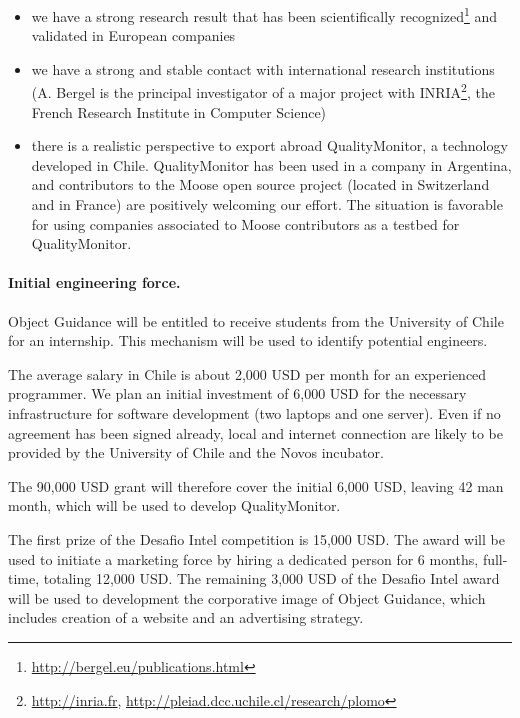 \documentclass[runningheads]{llncs}
\begin{document}
\begin{itemize}
\item we have a strong research result that has been scientifically recognized\footnote{\url{http://bergel.eu/publications.html}} and validated in European companies
\item we have a strong and stable contact with international research institutions (A. Bergel is the principal investigator of a major project with INRIA\footnote{\url{http://inria.fr}, \url{http://pleiad.dcc.uchile.cl/research/plomo}}, the French Research Institute in Computer Science)
\item there is a realistic perspective to export abroad QualityMonitor, a technology developed in Chile. QualityMonitor has been used in a company in Argentina, and contributors to the Moose open source project (located in Switzerland and in France) are positively welcoming our effort. The situation is favorable for using companies associated to Moose contributors as a testbed for QualityMonitor.
\end{itemize}

\paragraph{Initial engineering force.} Object Guidance will be entitled to receive students from the University of Chile for an internship. This mechanism will be used to identify potential engineers.

The average salary in Chile is about 2,000 USD per month for an experienced programmer. We plan an initial investment of 6,000 USD for the necessary infrastructure for software development (two laptops and one server). Even if no agreement has been signed already, local and internet connection are likely to be provided by the University of Chile and the Novos incubator. 

The 90,000 USD grant will therefore cover the initial 6,000 USD, leaving 42 man month, which will be used to develop QualityMonitor. 

The first prize of the Desafio Intel competition is 15,000 USD. The award will be used to initiate a marketing force by hiring a dedicated person for 6 months, full-time, totaling 12,000 USD. The remaining 3,000 USD of the Desafio Intel award will be used to development the corporative image of Object Guidance, which includes creation of a website and an advertising strategy.

\end{document}
